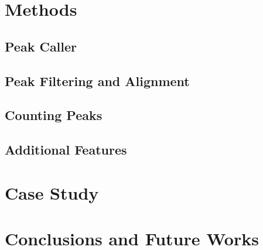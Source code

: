 \documentclass[b5paper,oneside,british,intoc,bibliograph=totoc,index=totoc,BCOR10mm,twoside,openright]{book}
\numberwithin{equation}{section}
\numberwithin{figure}{section}
\begin{document}
\section{Methods} \label{sec:descan2methods}


\subsection{Peak Caller} \label{sec:descan2peakcall}


\subsection{Peak Filtering and Alignment} \label{sec:descan2filtering}


\subsection{Counting Peaks} \label{sec:descan2peakcounts}


\subsection{Additional Features} \label{sec:descan2addfeat}


\section{Case Study} \label{sec:descan2results}


\section{Conclusions and Future Works} \label{sec:descan2next}


\end{document}
